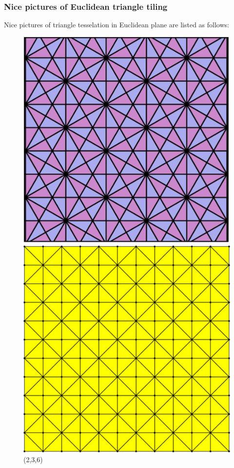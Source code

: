 \documentclass{article}
\begin{document}
\subsubsection{Nice pictures of Euclidean triangle tiling}
Nice pictures of triangle tesselation in Euclidean plane are listed as follows:
\begin{figure}[h]%
    \centering
    \begin{minipage}{0.22\linewidth}
        \centering
        \includegraphics[width={0.8\linewidth}]{2_3_6.png}
        \caption{(2,3,6)}
    \end{minipage}
    \begin{minipage}{0.22\linewidth}
        \centering
        \includegraphics[width={0.8\linewidth}]{2_4_4.png}

\end{minipage}
\end{figure}
\end{document}
